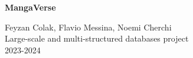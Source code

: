 
\begin{titlepage}
    \centering
    \vspace*{1cm}
    
    \Huge
    \textbf{{\textcolor{myBlue}{MangaVerse}} }\\
    
    \vspace{1.5cm}
    
    \Large
    Feyzan Colak, Flavio Messina, Noemi Cherchi  \\
    Large-scale and multi-structured databases project \\
    2023-2024 \\
    
    \vfill
    
    
\end{titlepage}
